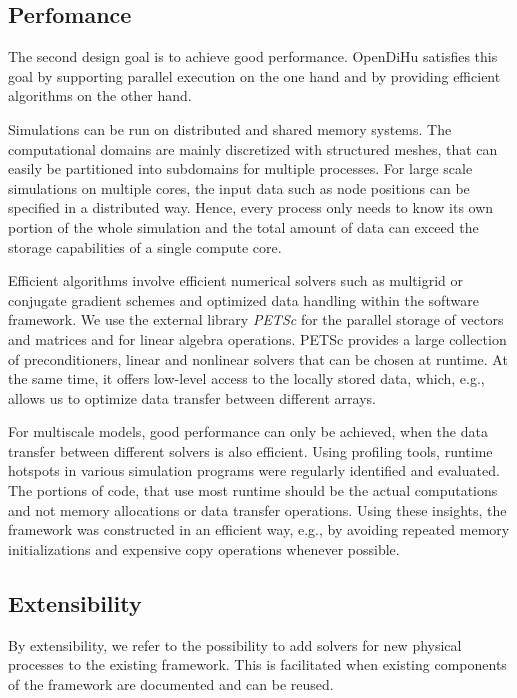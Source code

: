 \subsection{Perfomance}
The second design goal is to achieve good performance.
OpenDiHu satisfies this goal by supporting parallel execution on the one hand and by providing efficient algorithms on the other hand. 

Simulations can be run on distributed and shared memory systems. The computational domains are mainly discretized with structured meshes, that can easily be partitioned into subdomains for multiple processes. For large scale simulations on multiple cores, the input data such as node positions can be specified in a distributed way. Hence, every process only needs to know its own portion of the whole simulation and the total amount of data can exceed the storage capabilities of a single compute core.

Efficient algorithms involve efficient numerical solvers such as multigrid or conjugate gradient schemes and optimized data handling within the software framework.
We use the external library \emph{PETSc} \cite{petsc-efficient1997} for the parallel storage of vectors and matrices and for linear algebra operations. PETSc provides a large collection of preconditioners, linear and nonlinear solvers that can be chosen at runtime. At the same time, it offers low-level access to the locally stored data, which, e.g., allows us to optimize data transfer between different arrays.

For multiscale models, good performance can only be achieved, when the data transfer between different solvers is also efficient. Using profiling tools, runtime hotspots in various simulation programs were regularly identified and evaluated. The portions of code, that use  most runtime should be the actual computations and not memory allocations or data transfer operations.
Using these insights, the framework was constructed in an efficient way, e.g., by avoiding repeated memory initializations and expensive copy operations whenever possible.

\subsection{Extensibility}
By extensibility, we refer to the possibility to add solvers for new physical processes to the existing framework.
This is facilitated when existing components of the framework are documented and can be reused. 

